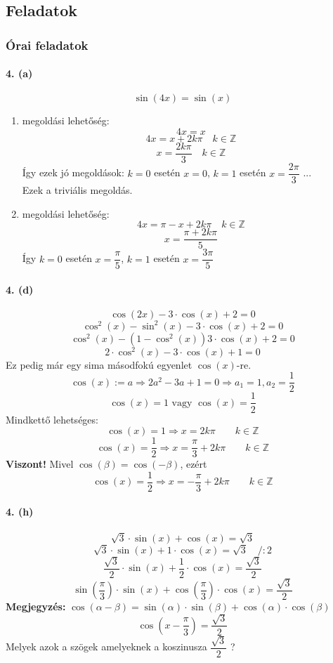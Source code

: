 \documentclass[12pt,a4paper,fleqn]{article}
\newcommand{\myparagraph}[1]{\paragraph{#1}\mbox{}}
\begin{document}
\subsection{Feladatok}
\subsubsection{Órai feladatok}


\myparagraph{4. (a)}
\[ \sin(4x) = \sin(x) \]
\begin{enumerate}
  \item megoldási lehetőség:
  \[ 4x = x \]
  \[ 4x = x + 2k\pi \quad k \in \mathbb{Z} \]
  \[ x = \dfrac{2k\pi}{3} \quad k \in \mathbb{Z} \]
  Így ezek jó megoldások: $k = 0$ esetén $x = 0$, $k = 1$ esetén $x =
    \dfrac{2\pi}{3}$ ... \\
  Ezek a triviális megoldás.
  \item megoldási lehetőség:
  \[ 4x = \pi - x + 2k\pi \quad k \in \mathbb{Z} \]
  \[ x = \dfrac{\pi + 2k\pi}{5} \]
  Így $k = 0$ esetén $x = \dfrac{\pi}{5}$, $k = 1$ esetén $x = \dfrac{3\pi}{5}$
\end{enumerate}


\myparagraph{4. (d)}
\[ \cos(2x) - 3 \cdot \cos(x) + 2 = 0 \]
\[ \cos^2(x) - \sin^2(x) - 3 \cdot \cos(x) + 2 = 0 \]
\[ \cos^2(x) - (1- \cos^2(x)) 3 \cdot \cos(x) + 2 = 0 \]
\[ 2 \cdot \cos^2(x) - 3 \cdot \cos(x) + 1 = 0 \]
Ez pedig már egy sima másodfokú egyenlet $\cos(x)$-re.
\[ \cos(x) := a \Rightarrow 2a^2 - 3a + 1 = 0 \Rightarrow a_1 = 1, a_2 = \frac{1}{2} \]
\[ \cos(x) = 1 \text{ vagy } \cos(x) = \frac{1}{2}\]
Mindkettő lehetséges:
\[ \cos(x) = 1 \Rightarrow x = 2k\pi \qquad k \in \mathbb{Z} \]
\[ \cos(x) = \dfrac{1}{2} \Rightarrow x = \dfrac{\pi}{3} + 2k\pi \qquad k \in \mathbb{Z} \]
\textbf{Viszont!} Mivel $\cos(\beta) = \cos(-\beta)$, ezért
\[ \cos(x) = \dfrac{1}{2} \Rightarrow x = -\dfrac{\pi}{3} + 2k\pi \qquad k \in \mathbb{Z} \]

\myparagraph{4. (h)}
\[ \sqrt{3} \cdot \sin(x) + \cos(x) = \sqrt{3} \]
\[ \sqrt{3} \cdot \sin(x) + 1 \cdot \cos(x) = \sqrt{3} \quad /:2 \]
\[ \dfrac{\sqrt{3}}{2} \cdot \sin(x) + \dfrac{1}{2} \cdot \cos(x) = \dfrac{\sqrt{3}}{2} \]
\[ \sin\left(\dfrac{\pi}{3}\right) \cdot \sin(x) +
\cos\left(\dfrac{\pi}{3}\right) \cdot \cos(x) = \dfrac{\sqrt{3}}{2} \]
\textbf{Megjegyzés:} $\cos(\alpha - \beta) =
  \sin(\alpha) \cdot \sin(\beta) + \cos(\alpha) \cdot \cos(\beta) $
\[ \cos\left( x - \dfrac{\pi}{3} \right) = \dfrac{\sqrt{3}}{2} \]
Melyek azok a szögek amelyeknek a koszinusza $\dfrac{\sqrt{3}}{2}$ ?
\end{document}
